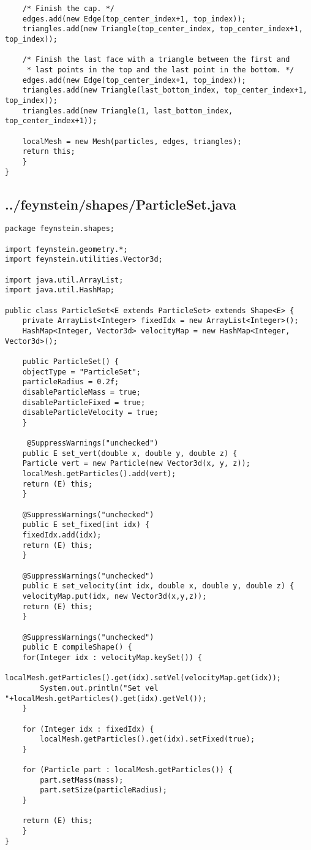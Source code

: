 \begin{lstlisting}
	/* Finish the cap. */
	edges.add(new Edge(top_center_index+1, top_index));
	triangles.add(new Triangle(top_center_index, top_center_index+1, top_index));

	/* Finish the last face with a triangle between the first and
	 * last points in the top and the last point in the bottom. */
	edges.add(new Edge(top_center_index+1, top_index));
	triangles.add(new Triangle(last_bottom_index, top_center_index+1, top_index));
	triangles.add(new Triangle(1, last_bottom_index, top_center_index+1));

	localMesh = new Mesh(particles, edges, triangles);
	return this;
    }
}\end{lstlisting}

\subsection*{../feynstein/shapes/ParticleSet.java}
\begin{lstlisting}
package feynstein.shapes;

import feynstein.geometry.*;
import feynstein.utilities.Vector3d;

import java.util.ArrayList;
import java.util.HashMap;

public class ParticleSet<E extends ParticleSet> extends Shape<E> {
    private ArrayList<Integer> fixedIdx = new ArrayList<Integer>();
    HashMap<Integer, Vector3d> velocityMap = new HashMap<Integer, Vector3d>();
	
    public ParticleSet() {
	objectType = "ParticleSet";
	particleRadius = 0.2f;
	disableParticleMass = true;
	disableParticleFixed = true;
	disableParticleVelocity = true;
    }
    
	 @SuppressWarnings("unchecked")
    public E set_vert(double x, double y, double z) {
	Particle vert = new Particle(new Vector3d(x, y, z));
	localMesh.getParticles().add(vert);
	return (E) this;
    }
	
	@SuppressWarnings("unchecked")
    public E set_fixed(int idx) {
	fixedIdx.add(idx);
	return (E) this;
    }
	
	@SuppressWarnings("unchecked")
    public E set_velocity(int idx, double x, double y, double z) {
	velocityMap.put(idx, new Vector3d(x,y,z));
	return (E) this;
    }

    @SuppressWarnings("unchecked")
    public E compileShape() {
	for(Integer idx : velocityMap.keySet()) {
	    localMesh.getParticles().get(idx).setVel(velocityMap.get(idx));
	    System.out.println("Set vel "+localMesh.getParticles().get(idx).getVel());
	}

	for (Integer idx : fixedIdx) {
	    localMesh.getParticles().get(idx).setFixed(true);
	}

	for (Particle part : localMesh.getParticles()) {
	    part.setMass(mass);
	    part.setSize(particleRadius);
	}

	return (E) this;
    }
}\end{lstlisting}

